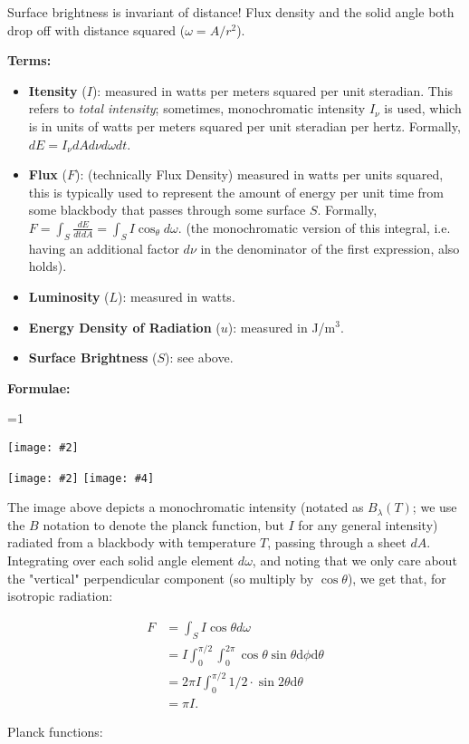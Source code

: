 \documentclass[11pt]{article}
\newcommand{\image}[5][1]{
\ifnum #1=1 
    \begin{center}
        \texttt{[image: \#2]}
    \end{center}
\else
    \begin{center}
        \texttt{[image: \#2]}
        \texttt{[image: \#4]}
    \end{center}
\fi
}
\begin{document}
Surface brightness is invariant of distance! Flux density and the solid angle both drop off with distance squared ($\omega = A/r^2$).

\textbf{Terms:}

\begin{itemize}
\item \textbf{Itensity} ($I$): measured in watts per meters squared per unit steradian. This refers to \textit{total intensity}; sometimes, monochromatic intensity $I_\nu$ is used, which is in units of watts per meters squared per unit steradian per hertz. Formally, $dE = I_{\nu} dA d\nu d\omega dt$. 
\item \textbf{Flux} ($F$): (technically Flux Density) measured in watts per units squared, this is typically used to represent the amount of energy per unit time from some blackbody that passes through some surface $S$. Formally, $F = \int_S \frac{dE}{dt dA} = \int_S I\cos_{\theta}d\omega$. (the monochromatic version of this integral, i.e. having an additional factor $d\nu$ in the denominator of the first expression, also holds).
\item \textbf{Luminosity} ($L$): measured in watts. 
\item \textbf{Energy Density of Radiation} ($u$): measured in J/m$^3$.
\item \textbf{Surface Brightness} ($S$): see above.
\end{itemize}

\textbf{Formulae:}

\image{images/intensity.png}{9}{}{}

The image above depicts a monochromatic intensity (notated as $B_{\lambda}(T)$; we use the $B$ notation to denote the planck function, but $I$ for any general intensity) radiated from a blackbody with temperature $T$, passing through a sheet $dA$. Integrating over each solid angle element $d\omega$, and noting that we only care about the "vertical" perpendicular component (so multiply by $\cos\theta$), we get that, for isotropic radiation:

\begin{align*}
F &= \int_S I\cos{\theta}d\omega \\
&= I \int_{0}^{\pi/2}\int_{0}^{2\pi}\cos{\theta}\sin{\theta}\mathrm{d}\phi \mathrm{d}\theta \\
&= 2\pi I\int_{0}^{\pi / 2}1/2\cdot \sin{2\theta}\mathrm{d}\theta \\
&= \pi I.
\end{align*}

Planck functions:
\end{document}
